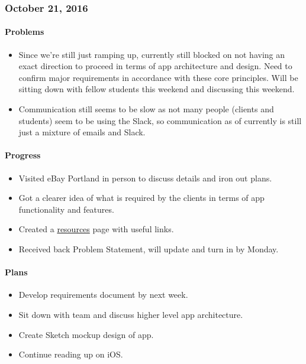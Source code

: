 \subsubsection{October 21, 2016}\label{section}
\paragraph{Problems}\label{problems}
\begin{itemize}
\tightlist
\item
  Since we're still just ramping up, currently still blocked on not
  having an exact direction to proceed in terms of app architecture and
  design. Need to confirm major requirements in accordance with these
  core principles. Will be sitting down with fellow students this
  weekend and discussing this weekend.
\item
  Communication still seems to be slow as not many people (clients and
  students) seem to be using the Slack, so communication as of currently
  is still just a mixture of emails and Slack.
\end{itemize}
\paragraph{Progress}\label{progress}
\begin{itemize}
\tightlist
\item
  Visited eBay Portland in person to discuss details and iron out plans.
\item
  Got a clearer idea of what is required by the clients in terms of app
  functionality and features.
\item
  Created a
  \href{https://github.com/iOS-Capstone/C7-Fit/wiki/Resources}{resources}
  page with useful links.
\item
  Received back Problem Statement, will update and turn in by Monday.
\end{itemize}
\paragraph{Plans}\label{plans}
\begin{itemize}
\tightlist
\item
  Develop requirements document by next week.
\item
  Sit down with team and discuss higher level app architecture.
\item
  Create Sketch mockup design of app.
\item
  Continue reading up on iOS.
\end{itemize}

